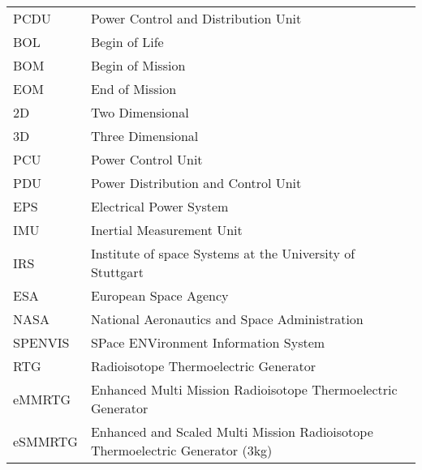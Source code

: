 \begin{table}[htb]
\begin{tabular}[l]{ll}
PCDU    & Power Control and Distribution Unit \\
BOL     & Begin of Life \\
BOM     & Begin of Mission \\
EOM     & End of Mission \\
2D		& Two Dimensional \\
3D		& Three Dimensional \\
PCU     & Power Control Unit \\
PDU     & Power Distribution and Control Unit \\
EPS     & Electrical Power System \\
IMU     & Inertial Measurement Unit \\
IRS     & Institute of space Systems at the University of Stuttgart \\
ESA		&	European Space Agency	\\
NASA    &   National Aeronautics and Space Administration \\
SPENVIS	&	SPace ENVironment Information System	\\
RTG     & Radioisotope Thermoelectric Generator \\
eMMRTG  & Enhanced Multi Mission Radioisotope Thermoelectric Generator \\
eSMMRTG & Enhanced and Scaled Multi Mission Radioisotope Thermoelectric Generator (3kg) \\

\end{tabular}
\end{table}

\cleardoublepage